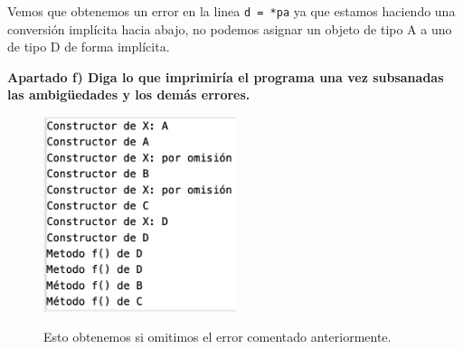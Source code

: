Vemos que obtenemos un error en la linea \texttt{d = *pa} ya que estamos haciendo una conversión implícita hacia abajo, no podemos asignar un objeto de tipo A a uno de tipo D de forma implícita.

\textbf{\large Apartado f) Diga lo que imprimiría el programa una vez subsanadas las ambigüedades y los demás errores.}
\begin{figure}[h]
  \begin{center}
    \includegraphics[width=0.5\textwidth]{assets/Mayo2008_2.png}
  \end{center}
  Esto obtenemos si omitimos el error comentado anteriormente.
\end{figure}
